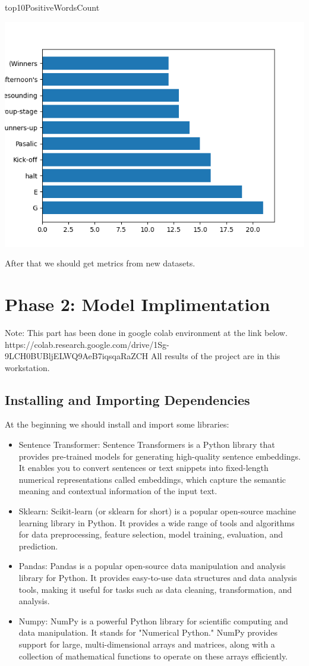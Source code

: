 \documentclass{article}
\begin{document}
top10PositiveWordsCount
\begin{center}
    \includegraphics{top10PositiveWordsCount.png}
\end{center}

After that we should get metrics from new datasets. 
\section{Phase 2: Model Implimentation}
Note: This part has been done in google colab environment at the link below.
https://colab.research.google.com/drive/1Sg-9LCH0BUBljELWQ9AeB7iqsqaRaZCH
All results of the project are in this workstation.


\subsection{Installing and Importing Dependencies}
At the beginning we should install and import some libraries:
\begin{itemize}
    \item Sentence Transformer: Sentence Transformers is a Python library that provides pre-trained models for generating high-quality sentence embeddings. It enables you to convert sentences or text snippets into fixed-length numerical representations called embeddings, which capture the semantic meaning and contextual information of the input text.
    \item Sklearn: Scikit-learn (or sklearn for short) is a popular open-source machine learning library in Python. It provides a wide range of tools and algorithms for data preprocessing, feature selection, model training, evaluation, and prediction.
    \item Pandas: Pandas is a popular open-source data manipulation and analysis library for Python. It provides easy-to-use data structures and data analysis tools, making it useful for tasks such as data cleaning, transformation, and analysis.
    \item Numpy: NumPy is a powerful Python library for scientific computing and data manipulation. It stands for "Numerical Python." NumPy provides support for large, multi-dimensional arrays and matrices, along with a collection of mathematical functions to operate on these arrays efficiently.
\end{itemize}
\end{document}
